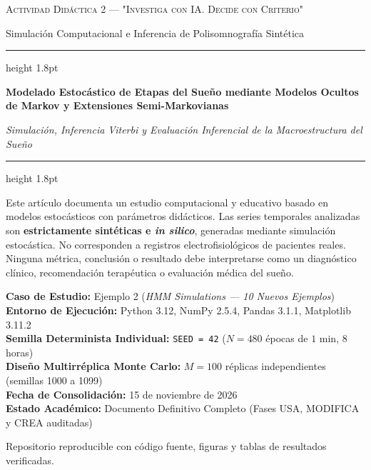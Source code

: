 \documentclass[11pt,a4paper]{article}
\begin{document}
\begin{titlepage}
    \centering
    \vspace*{0.8cm}
    
    {\scshape\Large Actividad Didáctica 2 --- "Investiga con IA. Decide con Criterio"\par}
    \vspace{0.3cm}
    {\large Simulación Computacional e Inferencia de Polisomnografía Sintética\par}
    
    \vspace{1.0cm}
    \hrule height 1.8pt
    \vspace{0.4cm}
    {\huge\bfseries Modelado Estocástico de Etapas del Sueño mediante Modelos Ocultos de Markov y Extensiones Semi-Markovianas\par}
    \vspace{0.3cm}
    {\Large\itshape Simulación, Inferencia Viterbi y Evaluación Inferencial de la Macroestructura del Sueño\par}
    \vspace{0.4cm}
    \hrule height 1.8pt
    
    \vspace{1.2cm}
    \begin{tcolorbox}[colback=red!5!white,colframe=red!75!black,title={\bfseries Declaración Ética y de Alcance Metodológico}]
    \small
    Este artículo documenta un estudio computacional y educativo basado en modelos estocásticos con parámetros didácticos. Las series temporales analizadas son \textbf{estrictamente sintéticas e \textit{in silico}}, generadas mediante simulación estocástica. No corresponden a registros electrofisiológicos de pacientes reales. Ninguna métrica, conclusión o resultado debe interpretarse como un diagnóstico clínico, recomendación terapéutica o evaluación médica del sueño.
    \end{tcolorbox}
    
    \vspace{1.0cm}
    \begin{minipage}{0.9\textwidth}
    \centering
    \textbf{Caso de Estudio:} Ejemplo 2 (\textit{HMM Simulations --- 10 Nuevos Ejemplos})\\[0.15cm]
    \textbf{Entorno de Ejecución:} Python 3.12, NumPy 2.5.4, Pandas 3.1.1, Matplotlib 3.11.2\\[0.15cm]
    \textbf{Semilla Determinista Individual:} \texttt{SEED = 42} ($N = 480$ épocas de $1\text{ min}$, 8 horas)\\[0.15cm]
    \textbf{Diseño Multirréplica Monte Carlo:} $M = 100$ réplicas independientes (semillas 1000 a 1099)\\[0.15cm]
    \textbf{Fecha de Consolidación:} 15 de noviembre de 2026\\[0.15cm]
    \textbf{Estado Académico:} Documento Definitivo Completo (Fases USA, MODIFICA y CREA auditadas)
    \end{minipage}
    
    \vfill
    {\footnotesize Repositorio reproducible con código fuente, figuras y tablas de resultados verificadas.\par}
\end{titlepage}
\end{document}
